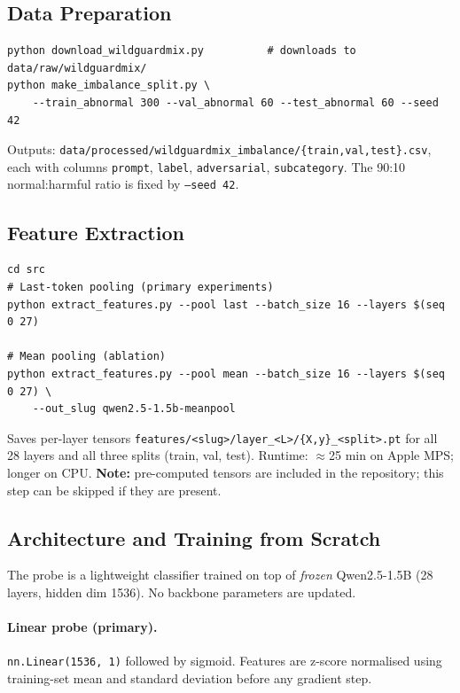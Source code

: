\documentclass[11pt,a4paper]{article}
\begin{document}
\subsection{Data Preparation}

\begin{lstlisting}
python download_wildguardmix.py          # downloads to data/raw/wildguardmix/
python make_imbalance_split.py \
    --train_abnormal 300 --val_abnormal 60 --test_abnormal 60 --seed 42
\end{lstlisting}

Outputs: \texttt{data/processed/wildguardmix\_imbalance/\{train,val,test\}.csv},
each with columns \texttt{prompt}, \texttt{label}, \texttt{adversarial},
\texttt{subcategory}. The 90:10 normal:harmful ratio is fixed by \texttt{--seed 42}.

\subsection{Feature Extraction}

\begin{lstlisting}
cd src
# Last-token pooling (primary experiments)
python extract_features.py --pool last --batch_size 16 --layers $(seq 0 27)

# Mean pooling (ablation)
python extract_features.py --pool mean --batch_size 16 --layers $(seq 0 27) \
    --out_slug qwen2.5-1.5b-meanpool
\end{lstlisting}

Saves per-layer tensors \texttt{features/<slug>/layer\_<L>/\{X,y\}\_<split>.pt}
for all 28 layers and all three splits (train, val, test).
Runtime: $\approx$25 min on Apple MPS; longer on CPU.
\textbf{Note:} pre-computed tensors are included in the repository; this step can
be skipped if they are present.

\subsection{Architecture and Training from Scratch}

The probe is a lightweight classifier trained on top of \emph{frozen} Qwen2.5-1.5B
(28 layers, hidden dim 1536). No backbone parameters are updated.

\paragraph{Linear probe (primary).}
\texttt{nn.Linear(1536, 1)} followed by sigmoid. Features are z-score normalised
using training-set mean and standard deviation before any gradient step.
\end{document}
